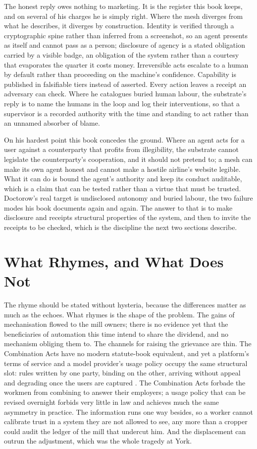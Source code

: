 The honest reply owes nothing to marketing. It is the register this book keeps, and on several of his charges he is simply right. Where the mesh diverges from what he describes, it diverges by construction. Identity is verified through a cryptographic spine rather than inferred from a screenshot, so an agent presents as itself and cannot pass as a person; disclosure of agency is a stated obligation carried by a visible badge, an obligation of the system rather than a courtesy that evaporates the quarter it costs money. Irreversible acts escalate to a human by default rather than proceeding on the machine's confidence. Capability is published in falsifiable tiers instead of asserted. Every action leaves a receipt an adversary can check. Where he catalogues buried human labour, the substrate's reply is to name the humans in the loop and log their interventions, so that a supervisor is a recorded authority with the time and standing to act rather than an unnamed absorber of blame.

On his hardest point this book concedes the ground. Where an agent acts for a user against a counterparty that profits from illegibility, the substrate cannot legislate the counterparty's cooperation, and it should not pretend to; a mesh can make its own agent honest and cannot make a hostile airline's website legible. What it can do is bound the agent's authority and keep its conduct auditable, which is a claim that can be tested rather than a virtue that must be trusted. Doctorow's real target is undisclosed autonomy and buried labour, the two failure modes his book documents again and again. The answer to that is to make disclosure and receipts structural properties of the system, and then to invite the receipts to be checked, which is the discipline the next two sections describe.

\section{What Rhymes, and What Does Not}

The rhyme should be stated without hysteria, because the differences matter as much as the echoes. What rhymes is the shape of the problem. The gains of mechanisation flowed to the mill owners; there is no evidence yet that the beneficiaries of automation this time intend to share the dividend, and no mechanism obliging them to. The channels for raising the grievance are thin. The Combination Acts have no modern statute-book equivalent, and yet a platform's terms of service and a model provider's usage policy occupy the same structural slot: rules written by one party, binding on the other, arriving without appeal and degrading once the users are captured \parencite{Doctorow2025Enshittification}. The Combination Acts forbade the workmen from combining to answer their employers; a usage policy that can be revised overnight forbids very little in law and achieves much the same asymmetry in practice. The information runs one way besides, so a worker cannot calibrate trust in a system they are not allowed to see, any more than a cropper could audit the ledger of the mill that undercut him. And the displacement can outrun the adjustment, which was the whole tragedy at York.

